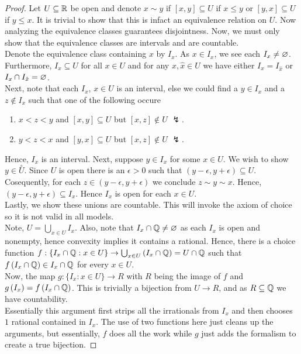 \begin{proof}
	Let \(U \subseteq \mathbb{R}\) be open and denote \(x \sim y\) if \(\left[ x, y \right] \subseteq U \) if \(x \le y\) or \(\left[ y, x \right] \subseteq U\) if \(y \le x\). It is trivial to show that this is infact an equivalence relation on \(U\). Now analyzing the equivalence classes guarantees disjointness. Now, we must only show that the equivalence classes are intervals and are countable.\\
	Denote the equivalence class containing \(x\) by \(I_{x}\). As \(x \in I_{x}\), we see each \(I_{x} \neq \varnothing\). Furthermore, \(I_{x} \subseteq U\) for all \(x \in U\) and for any \(x, \hat{x} \in U\) we have either \(I_{x} = I_{\hat{x}}\) or \(I_{x} \cap I_{\hat{x}} = \varnothing\).\\
	Next, note that each \(I_{x}\), \(x \in U\) is an interval, else we could find a \(y \in I_{x}\) and a \(z \not\in I_{x}\) such that one of the following occure
	\begin{enumerate}
		\item \(x<z<y\) and \([x, y] \subseteq U\) but \(\left[ x, z \right] \not\in U\) \(\lightning\).
			\item \( y < z < x\) and \(\left[ y, x \right] \subseteq U\) but \(\left[ x, z \right]  \not\in U\) \(\lightning\).
	\end{enumerate}
	Hence, \(I_{x}\) is an interval. Next, suppose \(y \in I_{x}\) for some \(x \in U\). We wish to show \(y \in \overset{\circ}{U}\). Since \(U\) is open there is an \(\epsilon > 0\) such that \(\left( y - \epsilon, y + \epsilon \right) \subseteq U\). Cosequently, for each \(z \in \left( y-\epsilon, y + \epsilon \right) \) we conclude \(z \sim y \sim x\). Hence, \(\left( y- \epsilon, y + \epsilon\right) \subseteq I_{x}\). Hence \(I_{x}\) is open for each \(x \in U\).\\
	Lastly, we show these unions are countable. This will invoke the axiom of choice so it is not valid in all models.\\
	Note, \(U = \bigcup_{x \in U} I_{x}\). Also, note that \(I_{x} \cap \mathbb{Q} \neq \varnothing\) as each \(I_{x}\) is open and nonempty, hence convexity implies it contains a rational. Hence, there is a choice function \(f: \{I_{x}\cap \mathbb{Q} : x \in U\}  \to \bigcup_{x \in U} \left( I_{x} \cap \mathbb{Q} \right) = U \cap \mathbb{Q}\) such that \(f\left( I_{x} \cap \mathbb{Q} \right) \in I_{x} \cap \mathbb{Q}\) for every \(x \in U\).\\
	Now, the map \(g: \{I_{x}: x \in U\} \to R \) with \(R\) being the image of \(f\) and \(g\left( I_{x} \right) = f\left( I_{x}\cap \mathbb{Q} \right)  \). This is trivially a bijection from \(U \to R\), and as \(R \subseteq \mathbb{Q}\) we have countability.
	\\ Essentially this argument first strips all the irrationals from \(I_{x}\) and then chooses \(1\) rational contained in \(I_{x}\). The use of two functions here just cleans up the arguments, but essentially, \(f\) does all the work while \(g\) just adds the formalism to create a true bijection.
\end{proof}

